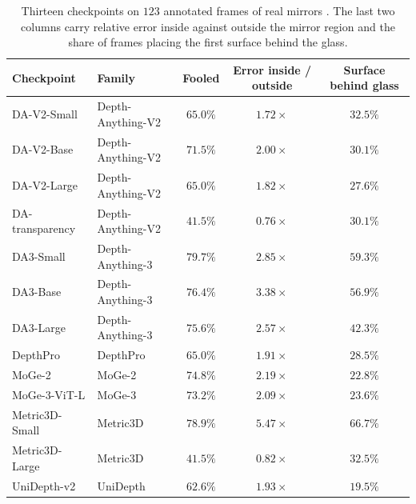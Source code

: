 \documentclass{article} %
\theoremstyle{defstyle}
\theoremstyle{plain}
\begin{document}
\begin{table}[!t]
\caption{Thirteen checkpoints on $123$ annotated frames of real mirrors \citep{mirror3d2021}. The last two columns carry relative error inside against outside the mirror region and the share of frames placing the first surface behind the glass.}
\label{tab:mirrors}
\begin{center}
\footnotesize \setlength{\tabcolsep}{4pt}
\begin{tabular}{llccc}
\toprule
\textbf{Checkpoint} & \textbf{Family} & \textbf{Fooled} &
\textbf{Error inside / outside} & \textbf{Surface behind glass} \\
\midrule
DA-V2-Small     & Depth-Anything-V2 & $65.0\%$ & $1.72\times$ & $32.5\%$ \\
DA-V2-Base      & Depth-Anything-V2 & $71.5\%$ & $2.00\times$ & $30.1\%$ \\
DA-V2-Large     & Depth-Anything-V2 & $65.0\%$ & $1.82\times$ & $27.6\%$ \\
DA-transparency & Depth-Anything-V2 & $41.5\%$ & $0.76\times$ & $30.1\%$ \\
DA3-Small       & Depth-Anything-3  & $\mathbf{79.7\%}$ & $2.85\times$ & $59.3\%$ \\
DA3-Base        & Depth-Anything-3  & $76.4\%$ & $3.38\times$ & $56.9\%$ \\
DA3-Large       & Depth-Anything-3  & $75.6\%$ & $2.57\times$ & $42.3\%$ \\
DepthPro        & DepthPro          & $65.0\%$ & $1.91\times$ & $28.5\%$ \\
MoGe-2          & MoGe-2            & $74.8\%$ & $2.19\times$ & $22.8\%$ \\
MoGe-3-ViT-L    & MoGe-3            & $73.2\%$ & $2.09\times$ & $23.6\%$ \\
Metric3D-Small  & Metric3D          & $78.9\%$ & $\mathbf{5.47\times}$ & $\mathbf{66.7\%}$ \\
Metric3D-Large  & Metric3D          & $41.5\%$ & $0.82\times$ & $32.5\%$ \\
UniDepth-v2     & UniDepth          & $62.6\%$ & $1.93\times$ & $19.5\%$ \\
\bottomrule
\end{tabular}
\end{center}
\end{table}
\end{document}
